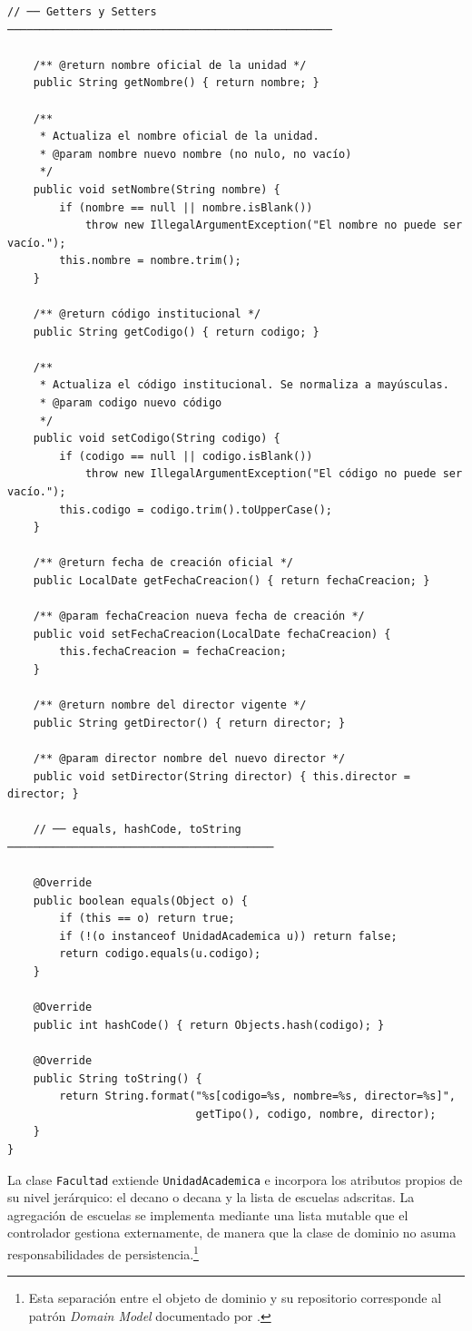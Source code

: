 \begin{lstlisting}[style=javaStyle, caption={Clase abstracta \texttt{UnidadAcademica}}, label={lst:unidad-academica}]
    // ── Getters y Setters ──────────────────────────────────────────────────

    /** @return nombre oficial de la unidad */
    public String getNombre() { return nombre; }

    /**
     * Actualiza el nombre oficial de la unidad.
     * @param nombre nuevo nombre (no nulo, no vacío)
     */
    public void setNombre(String nombre) {
        if (nombre == null || nombre.isBlank())
            throw new IllegalArgumentException("El nombre no puede ser vacío.");
        this.nombre = nombre.trim();
    }

    /** @return código institucional */
    public String getCodigo() { return codigo; }

    /**
     * Actualiza el código institucional. Se normaliza a mayúsculas.
     * @param codigo nuevo código
     */
    public void setCodigo(String codigo) {
        if (codigo == null || codigo.isBlank())
            throw new IllegalArgumentException("El código no puede ser vacío.");
        this.codigo = codigo.trim().toUpperCase();
    }

    /** @return fecha de creación oficial */
    public LocalDate getFechaCreacion() { return fechaCreacion; }

    /** @param fechaCreacion nueva fecha de creación */
    public void setFechaCreacion(LocalDate fechaCreacion) {
        this.fechaCreacion = fechaCreacion;
    }

    /** @return nombre del director vigente */
    public String getDirector() { return director; }

    /** @param director nombre del nuevo director */
    public void setDirector(String director) { this.director = director; }

    // ── equals, hashCode, toString ─────────────────────────────────────────

    @Override
    public boolean equals(Object o) {
        if (this == o) return true;
        if (!(o instanceof UnidadAcademica u)) return false;
        return codigo.equals(u.codigo);
    }

    @Override
    public int hashCode() { return Objects.hash(codigo); }

    @Override
    public String toString() {
        return String.format("%s[codigo=%s, nombre=%s, director=%s]",
                             getTipo(), codigo, nombre, director);
    }
}
\end{lstlisting}

\noindent
La clase \texttt{Facultad} extiende \texttt{UnidadAcademica} e incorpora los atributos
propios de su nivel jerárquico: el decano o decana y la lista de escuelas adscritas.
La agregación de escuelas se implementa mediante una lista mutable que el controlador
gestiona externamente, de manera que la clase de dominio no asuma responsabilidades
de persistencia.\footnote{Esta separación entre el objeto de dominio y su repositorio
corresponde al patrón \textit{Domain Model} documentado por \textcite{fowler2002patterns}.}

